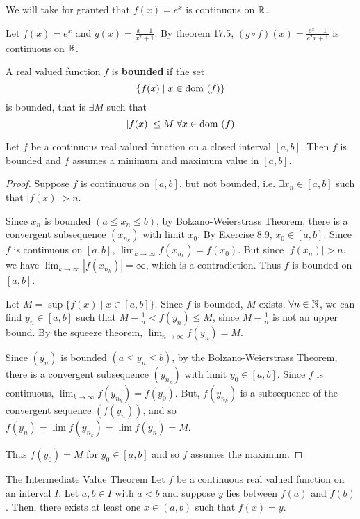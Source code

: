 \documentclass{article}
\begin{document}
\begin{remark}
We will take for granted that $f(x) = e^x$ is continuous on $\mathbb{R}$.
\end{remark}
\begin{example}
Let $f(x) = e^x$ and $g(x) = \frac{x-1}{x^2 + 1}$. By theorem 17.5, $(g \circ f)(x) = \frac{e^x - 1}{e^2x + 1}$ is continuous on $\mathbb{R}$.
\end{example}
\begin{definition}
A real valued function $f$ is \textbf{bounded} if the set \[
\{f(x) \mid x \in \text{dom }(f)\}
\]
is bounded, that is $\exists M$ such that \[
|f(x)| \leq M \; \forall x \in \text{dom }(f)
\]
\end{definition}
\begin{cthm}[Theorem 18.1]
Let $f$ be a continuous real valued function on a closed interval $[a, b]$. Then $f$ is bounded and $f$ assumes a minimum and maximum value in $[a, b]$.
\end{cthm}
\begin{proof}
Suppose $f$ is continuous on $[a,b]$, but not bounded, i.e. $\exists x_n \in [a, b]$ such that $|f(x)| > n$.

Since $x_n$ is bounded $(a \leq x_n \leq b)$, by Bolzano-Weierstrass Theorem, there is a convergent subsequence $(x_{n_k})$ with limit $x_0$. By Exercise 8.9, $x_0 \in [a, b]$. Since $f$ is continuous on $[a, b]$, $\lim_{k\to\infty} f(x_{n_k}) = f(x_0)$. But since $|f(x_n)| > n$, we have $\lim_{k\to\infty} |f(x_{n_k})| = \infty$, which is a contradiction. Thus $f$ is bounded on $[a, b]$.

Let $M = \sup\{f(x) \mid x \in [a, b]\}$. Since $f$ is bounded, $M$ exists. $\forall n \in \mathbb{N}$, we can find $y_n \in [a, b]$ such that $M - \frac{1}{n} < f(y_n) \leq M$, since $M - \frac{1}{n}$ is not an upper bound. By the squeeze theorem, $\lim_{n\to\infty} f(y_n) = M$.

Since $(y_n)$ is bounded $(a \leq y_n \leq b)$, by the Bolzano-Weierstrass Theorem, there is a convergent subsequence $(y_{n_k})$ with limit $y_0 \in [a, b]$. Since $f$ is continuous, $\lim_{k\to\infty} f(y_{n_k}) = f(y_0)$. But, $f(y_{n_k})$ is a subsequence of the convergent sequence $(f(y_n))$, and so $f(y_n) = \lim f(y_{n_k}) = \lim f(y_n) = M$.

Thus $f(y_0) = M$ for $y_0 \in [a, b]$ and so $f$ assumes the maximum.
\end{proof}
\begin{cthm}[Theorem 18.2] The Intermediate Value Theorem \newline
Let $f$ be a continuous real valued function on an interval $I$. Let $a, b \in I$ with $a < b$ and suppose $y$ lies between $f(a)$ and $f(b)$. Then, there exists at least one $x \in (a, b)$ such that $f(x) = y$.
\end{cthm}
\end{document}
